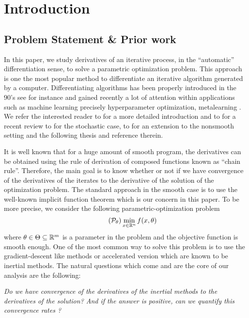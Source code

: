 \section{Introduction}\label{sec-intro}

\subsection{Problem Statement \& Prior work}
In this paper, we study derivatives of an iterative process, in the ``automatic'' differentiation sense, to solve a parametric optimization problem. This approach is  one the most popular method to differentiate an  iterative algorithm generated by a computer.  Differentiating algorithms has been properly introduced in the 90's see  \cite{gilbert92,beck1994} for instance and gained recently a lot of attention within applications such as machine learning precisely hyperparameter optimization, metalearning \etc. We refer the interested reader to  \cite{griewank1993,griewank2007} for a more detailed introduction and to \cite{baydin2018} for a recent review to  \cite{iutzeler24} for the stochastic case, to \cite{bolte22} for an extension to the nonsmooth setting  and the following  thesis \cite{vaiter2021} and reference therein.

 It is well known that for a huge amount of smooth program, the derivatives can be obtained using  the rule of derivation of  composed functions  known as ``chain rule''. Therefore, the main goal is to know whether or not if we have convergence of the derivatives of the iterates to the derivative of the solution of the optimization problem. The standard approach in the smooth case is to use the well-known implicit function theorem which is our concern in this paper. To be more precise, we consider the following parametric-optimization problem 
\begin{equation}\label{eq:param-optim-intro}\tag{$\calP_{\theta}$}
\min_{x\in\bbR^n}f(x,\theta)
\end{equation}
where $\theta\in\Theta \subseteq\mathbb{R}^m$ is a parameter in the problem and the objective function is smooth enough. One of the most common way to solve this problem is to use the gradient-descent  like methods or accelerated version which are known to be inertial methods. The natural questions which come and are the core of our analysis are the following: 

\textit{Do we have convergence of the derivatives of the inertial methods to the derivatives of the solution? And if the answer is positive, can we quantify this convergence rates ?}

